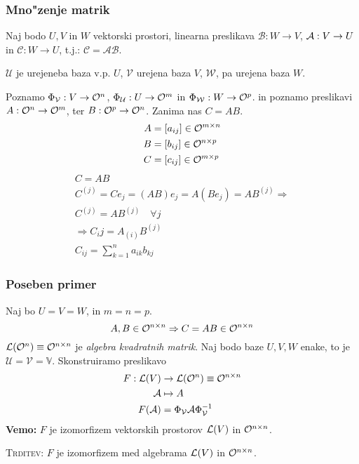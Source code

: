 \subsubsection{Mno"zenje matrik}
Naj bodo $U, V$ in $W$ vektorski prostori, linearna preslikava $\mathcal{B}: W \to V$, $\mathcal{A}: V \to U$ in $\mathcal{C}: W \to U$, t.j.: $\mathcal{C} = \mathcal{A} \mathcal{B}$. 

$\mathcal{U}$ je urejeneba baza v.p. $U$, $\mathcal{V}$ urejena baza $V$, $\mathcal{W}$, pa urejena baza $W$.

Poznamo $\Phi_{\mathcal{V}}: V \to \mathcal{O}^n$, $\Phi_{\mathcal{U}}: U \to \mathcal{O}^m$ in $\Phi_\mathcal{W}: W \to \mathcal{O}^p$. in poznamo preslikavi $A: \mathcal{O}^n \to \mathcal{O}^m$, ter $B: \mathcal{O}^p \to \mathcal{O}^n$. Zanima nas $C = AB$.
\begin{align*}
A &= [a_{ij}] \in \mathcal{O}^{m \times n} \\
B &= [b_{ij}] \in \mathcal{O}^{n \times p} \\
C &= [c_{ij}] \in \mathcal{O}^{m \times p}
\end{align*}
\begin{gather*}
C = AB \\
C^{(j)} = C e_j = (AB)e_j = A(B e_j) = AB^{(j)} \Rightarrow \\
C^{(j)} = AB^{(j)} \quad \forall j \\
\Rightarrow C_ij = A_{(i)} B^{(j)} \\
C_{ij} = \sum_{k = 1}^{n} a_{ik} b_{kj}
\end{gather*}
%
\subsubsection{Poseben primer}
Naj bo $U = V = W$, in $m = n = p$.
\begin{equation*}
A, B \in \mathcal{O}^{n \times n} \Rightarrow C = AB \in \mathcal{O}^{n \times n}
\end{equation*}
$\mathcal{L}(\mathcal{O}^n) \equiv \mathcal{O}^{n \times n}$  je \emph{algebra kvadratnih matrik}.
Naj bodo baze $U, V, W$ enake, to je $\mathcal{U} = \mathcal{V} = \mathbb{V}$. Skonstruiramo preslikavo
\begin{align*}
F: \mathcal{L}(V) &\to \mathcal{L}(\mathcal{O}^n) \equiv \mathcal{O}^{n \times n} \\
\mathcal{A} &\mapsto A \\
F(\mathcal{A}) &= \Phi_{\mathcal{V}} \mathcal{A} \Phi_{\mathcal{V}}^{-1}
\end{align*}
\textbf{Vemo:} $F$ je izomorfizem vektorskih prostorov $\mathcal{L}(V)$ in $\mathcal{O}^{n \times n}$.

\textsc{Trditev:} $F$ je izomorfizem med algebrama $\mathcal{L}(V)$ in $\mathcal{O}^{n \times n}$.

